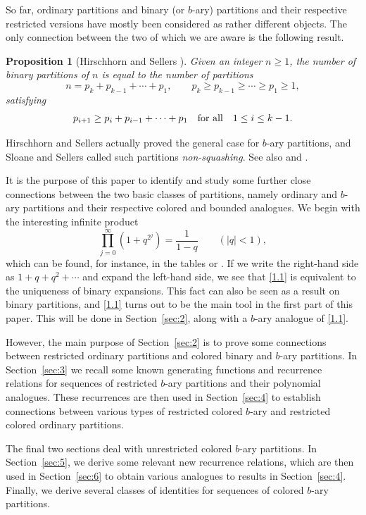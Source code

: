 \documentclass{amsart}
\theoremstyle{plain}
\newtheorem{proposition}[theorem]{Proposition}
\numberwithin{equation}{section}
\begin{document}
So far, ordinary partitions and binary (or $b$-ary) partitions and their
respective restricted versions have mostly been considered as rather different
objects. The only connection between the two of which we are aware is the 
following result.
 
\begin{proposition}[Hirschhorn and Sellers \cite{HS}]\label{prop:1.1}
Given an integer $n\geq 1$, the number of binary partitions of $n$ is
equal to the number of partitions
\[
n=p_k+p_{k-1}+\cdots+p_1,\qquad p_k\geq p_{k-1}\geq\cdots\geq p_1\geq 1,
\]
satisfying
\[
p_{i+1}\geq p_i+p_{i-1}+\cdots+p_1\quad\hbox{for all}\quad 1\leq i\leq k-1.
\]
\end{proposition}

Hirschhorn and Sellers actually proved the general case for $b$-ary partitions,
and Sloane and Sellers \cite{SS} called such partitions {\it non-squashing}.
See also \cite{AS} and \cite[A018819]{OEIS}.

It is the purpose of this paper to identify and study some further close
connections between the two basic classes of partitions, namely ordinary and
$b$-ary partitions and their respective colored and bounded analogues.
We begin with the interesting infinite product
\begin{equation}\label{1.1}
\prod_{j=0}^\infty\left(1+q^{2^j}\right)=\frac{1}{1-q}\qquad (|q|<1),
\end{equation}
which can be found, for instance, in the tables \cite[(89.30.2)]{Ha} or 
\cite[(6.2.3.1)]{PrE}. If we write the right-hand side as $1+q+q^2+\cdots$ and
expand the left-hand side, we see that \eqref{1.1} is equivalent to the 
uniqueness of binary expansions. This fact can also be seen as a result on
binary partitions, and \eqref{1.1} turns out to be the main tool in the first
part of this paper. This will be done in Section~\ref{sec:2}, along with a 
$b$-ary analogue of \eqref{1.1}.

However, the main purpose of Section~\ref{sec:2} is to prove some connections
between restricted ordinary partitions and colored binary and $b$-ary 
partitions. In Section~\ref{sec:3} we recall some known generating functions
and recurrence relations for sequences of restricted $b$-ary partitions and
their polynomial analogues. These recurrences are then used in 
Section~\ref{sec:4} to establish connections between various types of 
restricted colored $b$-ary and restricted colored ordinary partitions.

The final two sections deal with unrestricted colored $b$-ary partitions. In
Section~\ref{sec:5}, we derive some relevant new recurrence relations, which
are then used in Section~\ref{sec:6} to obtain various analogues to results in
Section~\ref{sec:4}. Finally, we derive several classes of identities for 
sequences of colored $b$-ary partitions.
\end{document}
